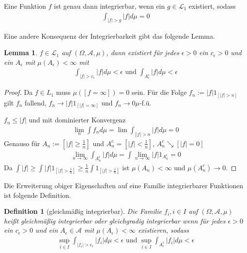 \documentclass[]{article}
\newtheorem{lemma}{Lemma}
\newtheorem{definition}{Definition}
\begin{document}
Eine Funktion $f$ ist genau dann integrierbar, wenn ein $g\in \mathcal{L}_1$ existiert, sodass
\begin{align*}
	\int_{|f|>g} |f| d\mu = 0
\end{align*}

Eine andere Konsequenz der Integrierbarkeit gibt das folgende Lemma.

\begin{lemma}
	$f\in\mathcal{L}_1$ auf $(\Omega, \mathcal{A}, \mu)$, dann existiert für jedes $\epsilon > 0$ ein $c_\epsilon > 0 $ und ein $A_\epsilon$ mit $\mu(A_\epsilon) < \infty$ mit
	\begin{align*}
		\int_{|f|>c_\epsilon} |f| d\mu < \epsilon \text{ und } \int_{A^c_\epsilon} |f| d\mu < \epsilon
	\end{align*}
\end{lemma}

\begin{proof}
	Da $f\in L_1$ muss $\mu([f=\infty])=0$ sein. Für die Folge $f_n:=|f|1_{[|f|>n]}$ gilt $f_n$ fallend, $f_n\rightarrow |f|1_{[|f|=\infty]}$ und $f_n\rightarrow0 \mu$-f.ü.
	
	$f_n \leq |f|$ und mit dominierter Konvergenz
	\begin{align*}
		\lim_n \int f_n d\mu = \lim \int_{[|f|>n} |f| d\mu = 0
	\end{align*}
	Genauso für $A_n := [|f|\geq \frac{1}{n}]$ und $A^c_n = [|f|<\frac{1}{n}]$, $A_n^c \searrow [|f|=0]$
	\begin{align*}
		\lim_{n\rightarrow\infty} \int_{A_n^c} |f| d\mu = \int \lim\limits_{n\rightarrow\infty} |f| 1_{A_n^c} = 0
	\end{align*}
	Da $\int|f| \geq \int |f| 1_{[|f|>\frac{1}{n}]} \geq \frac{1}{n} \int 1_{[|f|>\frac{1}{n}]}$ ist $\mu(A_n) < \infty$ und $\mu(A_n^c) \rightarrow 0$.
\end{proof}

Die Erweiterung obiger Eigenschaften auf eine Familie integrierbarer Funktionen ist folgende Definition.

\begin{definition}[gleichmäßig integrierbar]
	Die Familie ${f_i, i \in I}$ auf $(\Omega, \mathcal{A}, \mu)$ heißt gleichmäßig integrierbar oder gleichgradig integrierbar wenn für jedes $\epsilon > 0 $ ein $c_\epsilon > 0 $ und ein $A_\epsilon  \in \mathcal{A}$ mit $\mu(A_\epsilon) < \infty$ existieren, sodass
	\begin{align*}
		\sup_{i\in I} \int_{|f_i| > c_\epsilon} |f_i| d\mu < \epsilon \text{ und } \sup_{i\in I}\int_{A^c_\epsilon} |f_i| d\mu < \epsilon
	\end{align*}
\end{definition}
\end{document}
